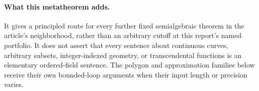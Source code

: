 \paragraph{What this metatheorem adds.}
It gives a principled route for every further fixed semialgebraic theorem
in the article's neighborhood, rather than an arbitrary cutoff at this
report's named portfolio. It does not assert that every sentence about
continuous curves, arbitrary subsets, integer-indexed geometry, or
transcendental functions is an elementary ordered-field sentence. The
polygon and approximation families below receive their own bounded-loop
arguments when their input length or precision varies.
